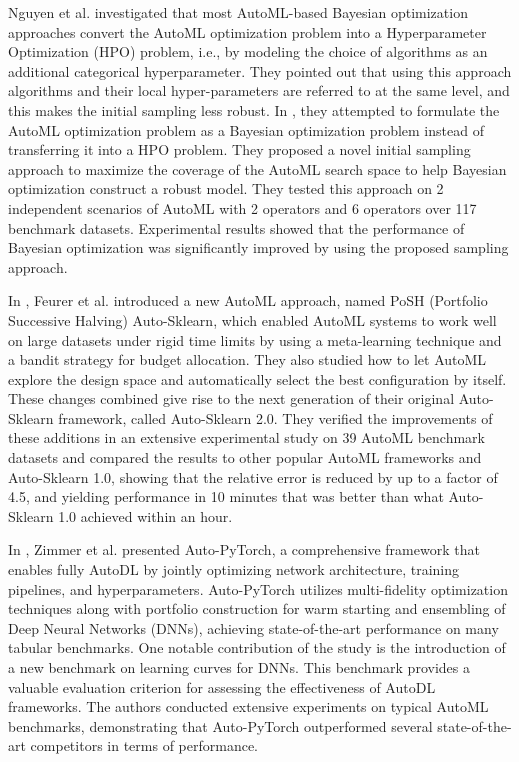 Nguyen et al. investigated that most AutoML-based Bayesian optimization approaches convert the AutoML optimization problem into a Hyperparameter Optimization (HPO) problem, i.e., by modeling the choice of algorithms as an additional categorical hyperparameter.
They pointed out that using this approach algorithms and their local hyper-parameters are referred to at the same level, and this makes the initial sampling less robust.
In \cite{9660073}, they attempted to formulate the AutoML optimization problem as a Bayesian optimization problem instead of transferring it into a HPO problem.
They proposed a novel initial sampling approach to maximize the coverage of the AutoML search space to help Bayesian optimization construct a robust model.
They tested this approach on 2 independent scenarios of AutoML with 2 operators and 6 operators over 117 benchmark datasets.
Experimental results showed that the performance of Bayesian optimization was significantly improved by using the proposed sampling approach.

In \cite{Feurer2020}, Feurer et al. introduced a new AutoML approach, named PoSH (Portfolio Successive Halving) Auto-Sklearn, which enabled AutoML systems to work well on large datasets under rigid time limits by using a meta-learning technique and a bandit strategy for budget allocation.
They also studied how to let AutoML explore the design space and automatically select the best configuration by itself.
These changes combined give rise to the next generation of their original Auto-Sklearn framework, called Auto-Sklearn 2.0.
They verified the improvements of these additions in an extensive experimental study on 39 AutoML benchmark datasets and compared the results to other popular AutoML frameworks and Auto-Sklearn 1.0, showing that the relative error is reduced by up to a factor of 4.5, and yielding performance in 10 minutes that was better than what Auto-Sklearn 1.0 achieved within an hour.

In \cite{Zimmer2020}, Zimmer et al. presented Auto-PyTorch, a comprehensive framework that enables fully AutoDL by jointly optimizing network architecture, training pipelines, and hyperparameters.
Auto-PyTorch utilizes multi-fidelity optimization techniques along with portfolio construction for warm starting and ensembling of Deep Neural Networks (DNNs), achieving state-of-the-art performance on many tabular benchmarks.
One notable contribution of the study is the introduction of a new benchmark on learning curves for DNNs.
This benchmark provides a valuable evaluation criterion for assessing the effectiveness of AutoDL frameworks.
The authors conducted extensive experiments on typical AutoML benchmarks, demonstrating that Auto-PyTorch outperformed several state-of-the-art competitors in terms of performance.

